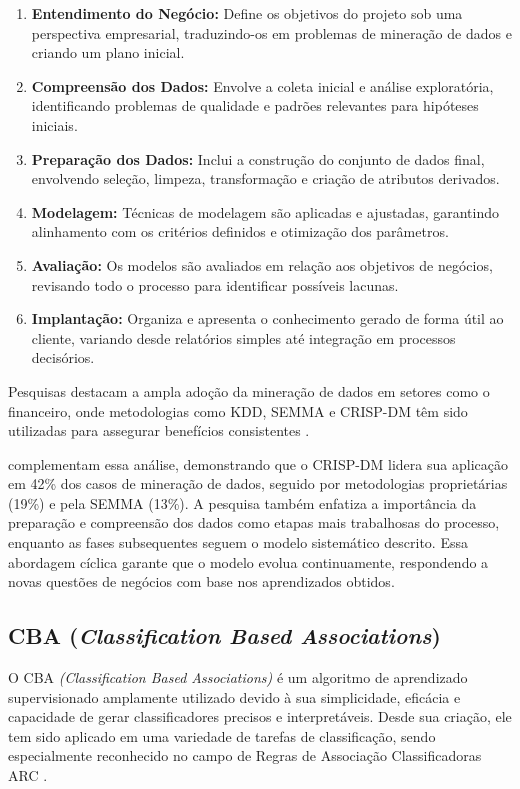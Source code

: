 \documentclass[12pt,a4paper]{article}
\begin{document}
\begin{enumerate}
    \item \textbf{Entendimento do Negócio:} Define os objetivos do projeto sob uma perspectiva empresarial, traduzindo-os em problemas de mineração de dados e criando um plano inicial.
    \item \textbf{Compreensão dos Dados:} Envolve a coleta inicial e análise exploratória, identificando problemas de qualidade e padrões relevantes para hipóteses iniciais.
    \item \textbf{Preparação dos Dados:} Inclui a construção do conjunto de dados final, envolvendo seleção, limpeza, transformação e criação de atributos derivados.
    \item \textbf{Modelagem:} Técnicas de modelagem são aplicadas e ajustadas, garantindo alinhamento com os critérios definidos e otimização dos parâmetros.
    \item \textbf{Avaliação:} Os modelos são avaliados em relação aos objetivos de negócios, revisando todo o processo para identificar possíveis lacunas.
    \item \textbf{Implantação:} Organiza e apresenta o conhecimento gerado de forma útil ao cliente, variando desde relatórios simples até integração em processos decisórios.
\end{enumerate}

Pesquisas destacam a ampla adoção da mineração de dados em setores como o financeiro, onde metodologias como KDD, SEMMA e CRISP-DM têm sido utilizadas para assegurar benefícios consistentes \cite{plotnikova2022}.

\cite{brzozowska2023} complementam essa análise, demonstrando que o CRISP-DM lidera sua aplicação em 42\% dos casos de mineração de dados, seguido por metodologias proprietárias (19\%) e pela SEMMA (13\%). A pesquisa também enfatiza a importância da preparação e compreensão dos dados como etapas mais trabalhosas do processo, enquanto as fases subsequentes seguem o modelo sistemático descrito. Essa abordagem cíclica garante que o modelo evolua continuamente, respondendo a novas questões de negócios com base nos aprendizados obtidos.

\subsection{CBA (\textit{Classification Based Associations})}

O CBA \textit{(Classification Based Associations)} é um algoritmo de aprendizado supervisionado amplamente utilizado devido à sua simplicidade, eficácia e capacidade de gerar classificadores precisos e interpretáveis. Desde sua criação, ele tem sido aplicado em uma variedade de tarefas de classificação, sendo especialmente reconhecido no campo de Regras de Associação Classificadoras ARC \cite{westermann2019}.
\end{document}
